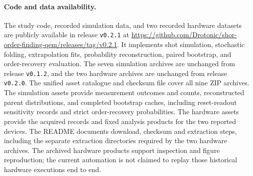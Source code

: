 \paragraph{Code and data availability.}
The study code, recorded simulation data, and two recorded hardware datasets
are publicly available in release \texttt{v0.2.1} at
\url{https://github.com/Drotonic/shor-order-finding-qem/releases/tag/v0.2.1}.
It implements shot simulation, stochastic folding, extrapolation fits,
probability reconstruction, paired bootstrap, and order-recovery evaluation.
The seven simulation archives are unchanged from release \texttt{v0.1.2}, and
the two hardware archives are unchanged from release \texttt{v0.2.0}.
The unified asset catalogue and checksum file cover all nine ZIP archives.
The simulation assets provide measurement outcomes and counts, reconstructed
parent distributions, and completed bootstrap caches, including reset-readout
sensitivity records and strict order-recovery probabilities.  The hardware
assets provide the acquired records and fixed analysis products for the two
reported devices.  The README documents download, checksum and extraction
steps, including the separate extraction directories required by the two
hardware archives.  The archived hardware products support inspection and
figure reproduction; the current automation is not claimed to replay those
historical hardware executions end to end.
